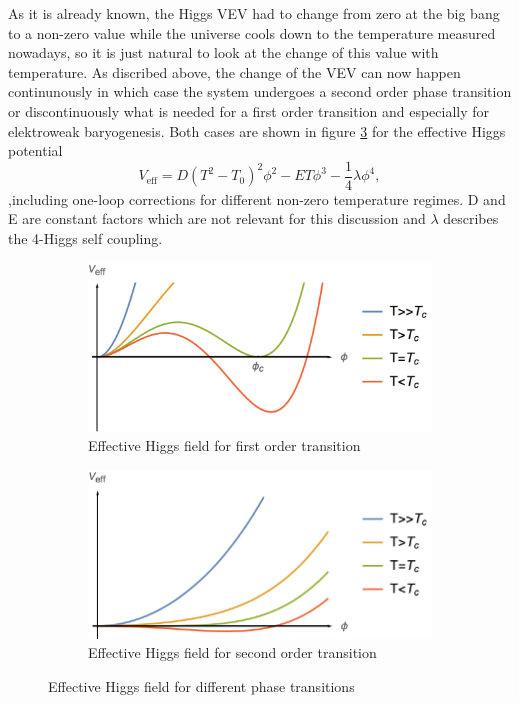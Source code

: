 As it is already known, the Higgs VEV had to change from zero at the big bang to a non-zero value while the universe cools down to the temperature measured nowadays, so it is just natural to look at the change of this value with temperature. As discribed above, the change of the VEV can now happen continunously in which case the system undergoes a second order phase transition or discontinuously what is needed for a first order transition and especially for elektroweak baryogenesis. 
Both cases are shown in figure \ref{fig:higgs} for the effective Higgs potential
\begin{equation}
	V_\text{eff}=D(T^2-T_0)^2\phi^2-ET\phi^3-\frac{1}{4}\lambda\phi^4,
	\label{effective_pot}
\end{equation}
,including one-loop corrections \cite{Petropoulos:2003pm} for different non-zero temperature regimes. D and E are constant factors which are not relevant for this discussion and $\lambda$ describes the 4-Higgs self coupling.
\begin{figure}[H]
	\centering
	\begin{subfigure}{0.7\textwidth}
		\includegraphics[width=\linewidth]{Images/Higgs1}
		\caption{Effective Higgs field for first order transition}
		\label{fig:higgs1}	
	\end{subfigure}
	\begin{subfigure}{0.7\textwidth}
		\includegraphics[width=\linewidth]{Images/Higgs2}
		\caption{Effective Higgs field for second order transition}
		\label{fig:higgs2}
	\end{subfigure}
	\caption{Effective Higgs field for different phase transitions}
	\label{fig:higgs}
\end{figure}
